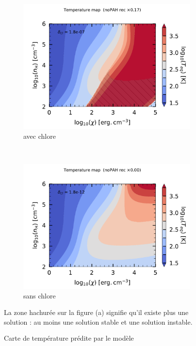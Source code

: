 \begin{figure}[!h]
    \centering
    \begin{subfigure}[t]{0.49\textwidth} %
        \centering \includegraphics[trim = {0 0 0 1cm},clip,width=1\textwidth]{figure/Cl/gridModel/mapG0nHTeq_m6p7_imp_noPAH_3p0PE_OI_CII_ggr_elecrec_lyman_OI.pdf}
        \caption{avec chlore}
    \end{subfigure}
    ~ 
    \begin{subfigure}[t]{0.49\textwidth}
        \centering \includegraphics[trim = {0 0 0 1cm},clip,width=1\textwidth]{figure/Cl/gridModel/mapG0nHTeq_m11p7_exp_noPAH_3p0PE_OI_CII_ggr_elecrec_lyman_OI.pdf}
        \caption{sans chlore}
    \end{subfigure}
    \caption{Carte de température prédite par le modèle}
     \begin{minipage}{\textwidth} 
     La zone hachurée sur la figure (a) signifie qu'il existe plus une solution : au moins une solution stable et une solution instable.
     \label{fig:Cl:gridModel:Tba:noCl}
     \end{minipage}
    \label{fig:Cl:gridModel:Tba}
\end{figure}

